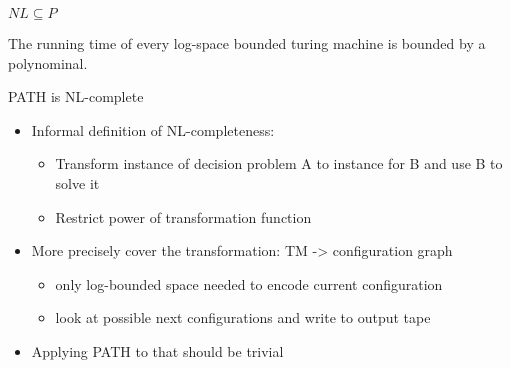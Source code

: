 \begin{frame}{$NL \subseteq P$}

\begin{theorem}
The running time of every log-space bounded turing machine is bounded by a polynominal.
\end{theorem}

\begin{block}
\end{block}

\end{frame}

\begin{frame}{PATH is NL-complete}

\begin{itemize}
\itemsep1pt\parskip0pt
\item
  Informal definition of NL-completeness:

  \begin{itemize}
  \itemsep1pt\parskip0pt
  \item
    Transform instance of decision problem A to instance for B and use B
    to solve it
  \item
    Restrict power of transformation function
  \end{itemize}
\item
  More precisely cover the transformation: TM -\textgreater{}
  configuration graph

  \begin{itemize}
  \itemsep1pt\parskip0pt
  \item
    only log-bounded space needed to encode current configuration
  \item
    look at possible next configurations and write to output tape
  \end{itemize}
\item
  Applying PATH to that should be trivial
\end{itemize}

\end{frame}

